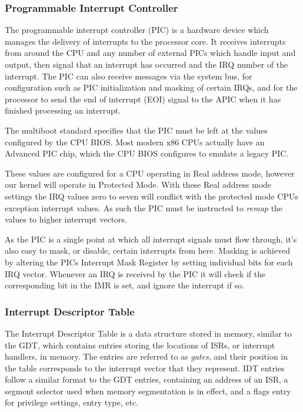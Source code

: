 \documentclass[10pt]{report}
\begin{document}
\subsubsection{Programmable Interrupt Controller}
The programmable interrupt controller (PIC) is a hardware device which manages the delivery of interrupts to the processor core\cite{guide2011intel}. It receives interrupts from around the CPU and any number of external PICs which handle input and output, then signal that an interrupt has occurred and the IRQ number of the interrupt. The PIC can also receive messages via the system bus, for configuration such as PIC initialization and masking of certain IRQs, and for the processor to send the end of interrupt (EOI) signal to the APIC when it has finished processing an interrupt.

The multiboot standard specifies that the PIC must be left at the values configured by the CPU BIOS\cite{multiboot-spec}. Most modern x86 CPUs actually have an Advanced PIC chip, which the CPU BIOS configures to emulate a legacy PIC.

These values are configured for a CPU operating in Real address mode, however our kernel will operate in Protected Mode. With these Real address mode settings the IRQ values zero to seven will conflict with the protected mode CPUs exception interrupt values. As such the PIC must be instructed to \textit{remap} the values to higher interrupt vectors.

As the PIC is a single point at which all interrupt signals must flow through, it's also easy to mask, or disable, certain interrupts from here. Masking is achieved by altering the PICs Interrupt Mask Register by setting individual bits for each IRQ vector. Whenever an IRQ is received by the PIC it will check if the corresponding bit in the IMR is set, and ignore the interrupt if so.


\subsubsection{Interrupt Descriptor Table}
The Interrupt Descriptor Table is a data structure stored in memory, similar to the GDT, which contains entries storing the locations of ISRs, or interrupt handlers, in memory. The entries are referred to as \textit{gates}, and their position in the table corresponds to the interrupt vector that they represent. IDT entries follow a similar format to the GDT entries, containing an address of an ISR, a segment selector used when memory segmentation is in effect, and a flags entry for privilege settings, entry type, etc.
\end{document}
